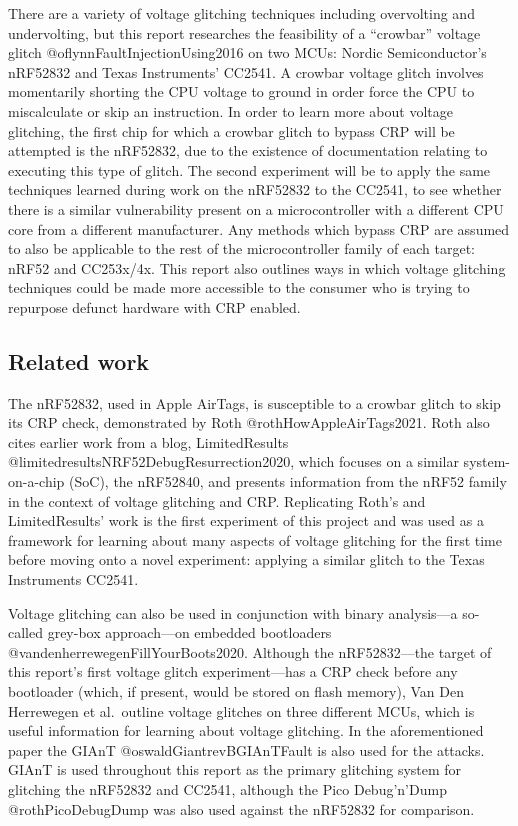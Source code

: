 There are a variety of voltage glitching techniques including
overvolting and undervolting, but this report researches the feasibility
of a ``crowbar'' voltage glitch @oflynnFaultInjectionUsing2016 on two
MCUs: Nordic Semiconductor's nRF52832 and Texas Instruments' CC2541. A
crowbar voltage glitch involves momentarily shorting the CPU voltage to
ground in order force the CPU to miscalculate or skip an instruction. In
order to learn more about voltage glitching, the first chip for which a
crowbar glitch to bypass CRP will be attempted is the nRF52832, due to
the existence of documentation relating to executing this type of
glitch. The second experiment will be to apply the same techniques
learned during work on the nRF52832 to the CC2541, to see whether there
is a similar vulnerability present on a microcontroller with a different
CPU core from a different manufacturer. Any methods which bypass CRP are
assumed to also be applicable to the rest of the microcontroller family
of each target: nRF52 and CC253x/4x. This report also outlines ways in
which voltage glitching techniques could be made more accessible to the
consumer who is trying to repurpose defunct hardware with CRP enabled.

\hypertarget{related-work}{%
\subsection{Related work}\label{related-work}}

The nRF52832, used in Apple AirTags, is susceptible to a crowbar glitch
to skip its CRP check, demonstrated by Roth @rothHowAppleAirTags2021.
Roth also cites earlier work from a blog, LimitedResults
@limitedresultsNRF52DebugResurrection2020, which focuses on a similar
system-on-a-chip (SoC), the nRF52840, and presents information from the
nRF52 family in the context of voltage glitching and CRP. Replicating
Roth's and LimitedResults' work is the first experiment of this project
and was used as a framework for learning about many aspects of voltage
glitching for the first time before moving onto a novel experiment:
applying a similar glitch to the Texas Instruments CC2541.

Voltage glitching can also be used in conjunction with binary
analysis---a so-called grey-box approach---on embedded bootloaders
@vandenherrewegenFillYourBoots2020. Although the nRF52832---the target
of this report's first voltage glitch experiment---has a CRP check
before any bootloader (which, if present, would be stored on flash
memory), Van Den Herrewegen et al.~outline voltage glitches on three
different MCUs, which is useful information for learning about voltage
glitching. In the aforementioned paper the GIAnT
@oswaldGiantrevBGIAnTFault is also used for the attacks. GIAnT is used
throughout this report as the primary glitching system for glitching the
nRF52832 and CC2541, although the Pico Debug'n'Dump @rothPicoDebugDump
was also used against the nRF52832 for comparison.

